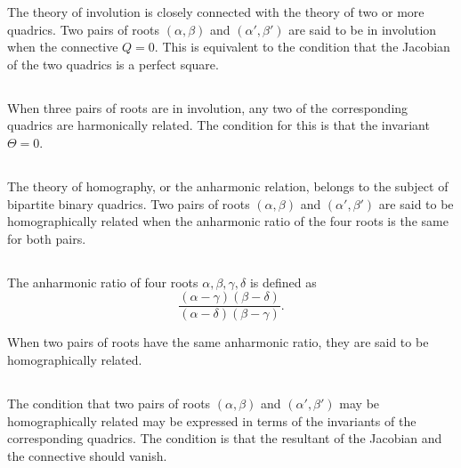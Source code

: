 \documentclass[12pt,a4paper]{article}
\begin{document}
The theory of involution is closely connected with the theory of two or more quadrics. Two pairs of roots $(\alpha, \beta)$ and $(\alpha', \beta')$ are said to be in involution when the connective $Q = 0$. This is equivalent to the condition that the Jacobian of the two quadrics is a perfect square.

\subsection{}

When three pairs of roots are in involution, any two of the corresponding quadrics are harmonically related. The condition for this is that the invariant $\Theta = 0$.

\subsection{}

The theory of homography, or the anharmonic relation, belongs to the subject of bipartite binary quadrics. Two pairs of roots $(\alpha, \beta)$ and $(\alpha', \beta')$ are said to be homographically related when the anharmonic ratio of the four roots is the same for both pairs.

\subsection{}

The anharmonic ratio of four roots $\alpha, \beta, \gamma, \delta$ is defined as
\[
\frac{(\alpha - \gamma)(\beta - \delta)}{(\alpha - \delta)(\beta - \gamma)}.
\]

When two pairs of roots have the same anharmonic ratio, they are said to be homographically related.

\subsection{}

The condition that two pairs of roots $(\alpha, \beta)$ and $(\alpha', \beta')$ may be homographically related may be expressed in terms of the invariants of the corresponding quadrics. The condition is that the resultant of the Jacobian and the connective should vanish.

\subsection{}
\end{document}
